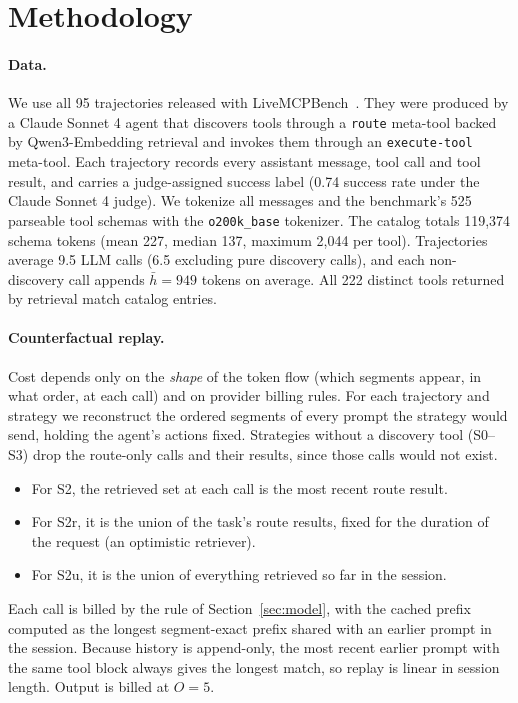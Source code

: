 \documentclass[11pt]{article}
\begin{document}
\section{Methodology}
\label{sec:method}
\paragraph{Data.} We use all 95 trajectories released with LiveMCPBench~\cite{livemcpbench}. They were produced by a Claude Sonnet 4 agent that discovers tools through a \texttt{route} meta-tool backed by Qwen3-Embedding retrieval and invokes them through an \texttt{execute-tool} meta-tool. Each trajectory records every assistant message, tool call and tool result, and carries a judge-assigned success label (0.74 success rate under the Claude Sonnet 4 judge). We tokenize all messages and the benchmark's 525 parseable tool schemas with the \texttt{o200k\_base} tokenizer. The catalog totals 119,374 schema tokens (mean 227, median 137, maximum 2,044 per tool). Trajectories average 9.5 LLM calls (6.5 excluding pure discovery calls), and each non-discovery call appends $\bar h = 949$ tokens on average. All 222 distinct tools returned by retrieval match catalog entries.

\paragraph{Counterfactual replay.} Cost depends only on the \emph{shape} of the token flow (which segments appear, in what order, at each call) and on provider billing rules. For each trajectory and strategy we reconstruct the ordered segments of every prompt the strategy would send, holding the agent's actions fixed. Strategies without a discovery tool (S0--S3) drop the route-only calls and their results, since those calls would not exist.
\begin{itemize}
\item For S2, the retrieved set at each call is the most recent route result.
\item For S2r, it is the union of the task's route results, fixed for the duration of the request (an optimistic retriever).
\item For S2u, it is the union of everything retrieved so far in the session.
\end{itemize}
Each call is billed by the rule of Section~\ref{sec:model}, with the cached prefix computed as the longest segment-exact prefix shared with an earlier prompt in the session. Because history is append-only, the most recent earlier prompt with the same tool block always gives the longest match, so replay is linear in session length. Output is billed at $O{=}5$.
\end{document}
